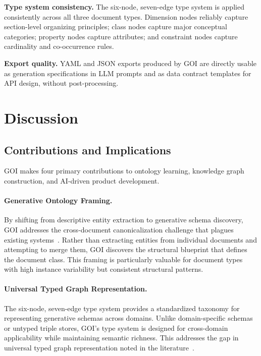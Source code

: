 \documentclass[runningheads,a4paper]{llncs}
\begin{document}
\textbf{Type system consistency.} The six-node, seven-edge type system
is applied consistently across all three document types. Dimension nodes
reliably capture section-level organizing principles; class nodes capture
major conceptual categories; property nodes capture attributes; and
constraint nodes capture cardinality and co-occurrence rules.

\textbf{Export quality.} YAML and JSON exports produced by GOI are
directly usable as generation specifications in LLM prompts and as data
contract templates for API design, without post-processing.

\section{Discussion}
\label{sec:discussion}

\subsection{Contributions and Implications}

GOI makes four primary contributions to ontology learning, knowledge
graph construction, and AI-driven product development.

\paragraph{Generative Ontology Framing.} By shifting from descriptive
entity extraction to generative schema discovery, GOI addresses the
cross-document canonicalization challenge that plagues existing
systems~\cite{zhang2024edc,wang2024autoclusre,chen2024itext2kg}. Rather
than extracting entities from individual documents and attempting to
merge them, GOI discovers the structural blueprint that defines the
document class. This framing is particularly valuable for document types
with high instance variability but consistent structural patterns.

\paragraph{Universal Typed Graph Representation.} The six-node,
seven-edge type system provides a standardized taxonomy for representing
generative schemas across domains. Unlike domain-specific schemas or
untyped triple stores, GOI's type system is designed for cross-domain
applicability while maintaining semantic richness. This addresses the
gap in universal typed graph representation noted in the
literature~\cite{lo2024endtoend,kumar2024taxonomic}.
\end{document}
